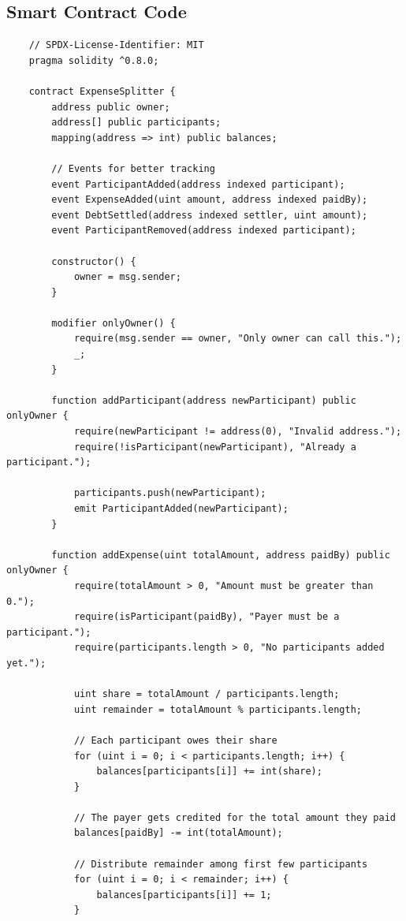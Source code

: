 \documentclass[12pt, a4paper]{article}
\begin{document}
\subsection{Smart Contract Code}
\begin{verbatim}
    // SPDX-License-Identifier: MIT
    pragma solidity ^0.8.0;

    contract ExpenseSplitter {
        address public owner;
        address[] public participants;
        mapping(address => int) public balances;
        
        // Events for better tracking
        event ParticipantAdded(address indexed participant);
        event ExpenseAdded(uint amount, address indexed paidBy);
        event DebtSettled(address indexed settler, uint amount);
        event ParticipantRemoved(address indexed participant);
        
        constructor() {
            owner = msg.sender;
        }
        
        modifier onlyOwner() {
            require(msg.sender == owner, "Only owner can call this.");
            _;
        }
        
        function addParticipant(address newParticipant) public onlyOwner {
            require(newParticipant != address(0), "Invalid address.");
            require(!isParticipant(newParticipant), "Already a participant.");
            
            participants.push(newParticipant);
            emit ParticipantAdded(newParticipant);
        }
        
        function addExpense(uint totalAmount, address paidBy) public onlyOwner {
            require(totalAmount > 0, "Amount must be greater than 0.");
            require(isParticipant(paidBy), "Payer must be a participant.");
            require(participants.length > 0, "No participants added yet.");
            
            uint share = totalAmount / participants.length;
            uint remainder = totalAmount % participants.length;
            
            // Each participant owes their share
            for (uint i = 0; i < participants.length; i++) {
                balances[participants[i]] += int(share);
            }
            
            // The payer gets credited for the total amount they paid
            balances[paidBy] -= int(totalAmount);
            
            // Distribute remainder among first few participants
            for (uint i = 0; i < remainder; i++) {
                balances[participants[i]] += 1;
            }
            

\end{verbatim}
\end{document}
